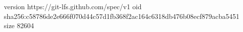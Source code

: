 version https://git-lfs.github.com/spec/v1
oid sha256:c58786de2e666f070d44c57d1fb368f2ac164c6318db476b08ecf879acba5451
size 82604
